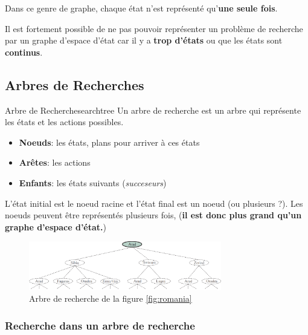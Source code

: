 \documentclass[a4paper, 12pt]{extarticle}
\begin{document}
\begin{warning}
    Dans ce genre de graphe, chaque état n'est représenté qu'\textbf{une seule fois}.
\end{warning}

\begin{remark}\leavevmode
    Il est fortement possible de ne pas pouvoir représenter un problème de recherche par un graphe d'espace d'état car 
    il y a \textbf{trop d'états} ou que les états sont \textbf{continus}.
\end{remark}


\subsection{Arbres de Recherches} %
\label{sub:arbres_de_recherches}

\begin{definition}{Arbre de Recherche}{searchtree}
    Un arbre de recherche est un arbre qui représente les états et les actions possibles.
    \begin{itemize}
        \item \textbf{Noeuds}: les états, plans pour arriver à ces états
        \item \textbf{Arêtes}: les actions
        \item \textbf{Enfants}: les états suivants (\textit{succeseurs})
    \end{itemize} 
    L'état initial est le noeud racine et l'état final est un noeud (ou plusieurs ?). 
    Les noeuds peuvent être représentés plusieurs fois, (\textbf{il est donc plus grand qu'un graphe d'espace d'état.})
\end{definition}

\begin{figure}[H]
    \begin{center}
        \includegraphics[width=0.75\textwidth]{./pictures/romst.png}
    \end{center}
    \caption{Arbre de recherche de la figure \ref{fig:romania}}\label{fig:romst}
\end{figure}

\subsubsection{Recherche dans un arbre de recherche} %
\label{sec:recherche_dans_un_arbre_de_recherche}
\end{document}
